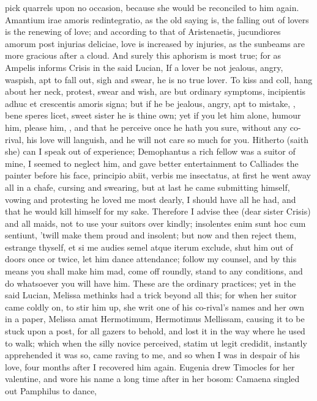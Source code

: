 {pick quarrels upon no occasion, because she would be reconciled to him
again. Amantium irae amoris redintegratio, as the old saying is, the
falling out of lovers is the renewing of love; and according to that of
Aristenaetis, jucundiores amorum post injurias deliciae, love is
increased by injuries, as the sunbeams are more gracious after a cloud.
And surely this aphorism is most true; for as Ampelis informs Crisis in
the said Lucian, If a lover be not jealous, angry, waspish, apt
to fall out, sigh and swear, he is no true lover. To kiss and coll,
hang about her neck, protest, swear and wish, are but ordinary
symptoms, incipientis adhuc et crescentis amoris signa; but if he be
jealous, angry, apt to mistake, \etc{}, bene speres licet, sweet sister he
is thine own; yet if you let him alone, humour him, please him, \etc{},
and that he perceive once he hath you sure, without any co-rival, his
love will languish, and he will not care so much for you. Hitherto
(saith she) can I speak out of experience; Demophantus a rich fellow
was a suitor of mine, I seemed to neglect him, and gave better
entertainment to Calliades the painter before his face, principio
abiit, verbis me insectatus, at first he went away all in a chafe,
cursing and swearing, but at last he came submitting himself, vowing
and protesting he loved me most dearly, I should have all he had, and
that he would kill himself for my sake. Therefore I advise thee (dear
sister Crisis) and all maids, not to use your suitors over kindly;
insolentes enim sunt hoc cum sentiunt, 'twill make them proud and
insolent; but now and then reject them, estrange thyself, et si me
audies semel atque iterum exclude, shut him out of doors once or twice,
let him dance attendance; follow my counsel, and by this means
you shall make him mad, come off roundly, stand to any
conditions, and do whatsoever you will have him. These are the ordinary
practices; yet in the said Lucian, Melissa methinks had a trick beyond
all this; for when her suitor came coldly on, to stir him up, she writ
one of his co-rival's names and her own in a paper, Melissa amat
Hermotimum, Hermotimus Mellissam, causing it to be stuck upon a post,
for all gazers to behold, and lost it in the way where he used to walk;
which when the silly novice perceived, statim ut legit credidit,
instantly apprehended it was so, came raving to me, \etc{} and so
when I was in despair of his love, four months after I recovered him
again. Eugenia drew Timocles for her valentine, and wore his name a
long time after in her bosom: Camaena singled out Pamphilus to dance,
}
